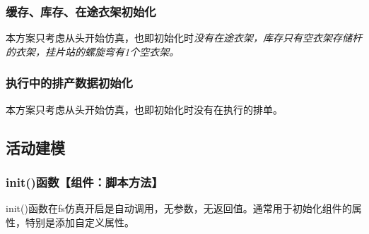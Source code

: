 	\subsubsection{缓存、库存、在途衣架初始化}
	本方案只考虑从头开始仿真，也即初始化时\it{没有在途衣架}，\it{库存只有空衣架存储杆的衣架}，挂片站的\it{螺旋弯有1个空衣架}。

	\subsubsection{执行中的排产数据初始化}
	本方案只考虑从头开始仿真，也即初始化时没有在执行的排单。
\subsection{活动建模}
\subsubsection{init()函数【组件：脚本方法】}\label{sec:active-model:init}
init()函数在fs仿真开启是自动调用，无参数，无返回值。通常用于初始化组件的属性，特别是添加自定义属性。
